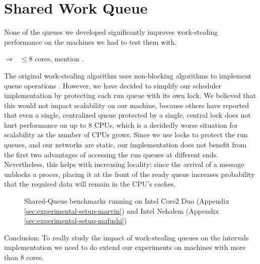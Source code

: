 

\section{Shared Work Queue}
\label{sec:queues-performance-shared-queue}

None of the queues we developed significantly improves work-stealing
performance on the machines we had to test them with.

$\Rightarrow\mbox{ }\le 8$ cores, mention \cite{Saha2007}.

The original work-stealing algorithm uses non-blocking algorithms to
implement queue operations \cite{Arora2001}. However, we have decided
to simplify our scheduler implementation by protecting each run queue
with its own lock. We believed that this would not impact scalability
on our machine, because others \cite{Saha2007} have reported that even
a single, centralized queue protected by a single, central lock does
not hurt performance on up to 8 CPUs, which is a decidedly worse
situation for scalability as the number of CPUs grows. Since we use
locks to protect the run queues, and our networks are static, our
implementation does not benefit from the first two advantages of
accessing the run queues at different ends. Nevertheless, this helps
with increasing locality: since the arrival of a message unblocks a
proces, placing it at the front of the ready queue increases
probability that the required data will remain in the CPU's caches.

\begin{figure}[htb]
  \centering
  \caption{Shared-Queue benchmarks running on Intel Core2 Duo (Appendix
    \ref{sec:experimental-setup-marvin}) and Intel Nehalem (Appendix
    \ref{sec:experimental-setup-mafushi})}
  \label{fig:queues-performance-shared-queue}
\end{figure}

Conclusion: To really study the impact of work-stealing queues on the
intervals implementation we need to do extend our experiments on
machines with more than 8 cores.



